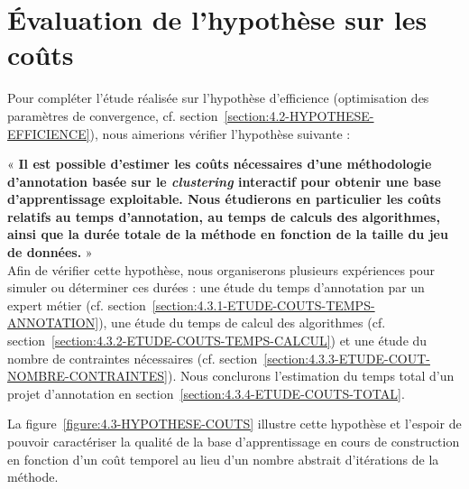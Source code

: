 \section{Évaluation de l'hypothèse sur les coûts}
\label{section:4.3-HYPOTHESE-COUTS}

	Pour compléter l'étude réalisée sur l'hypothèse d'efficience (optimisation des paramètres de convergence, cf. section~\ref{section:4.2-HYPOTHESE-EFFICIENCE}), nous aimerions vérifier l'hypothèse suivante :

	\begin{tcolorbox}[
		title=\faVial~\textbf{Hypothèse sur les coûts}~\faVial,
		colback=colorTcolorboxHypothesis!15,
		colframe=colorTcolorboxHypothesis!75,
		width=\linewidth
	]
		«\textbf{
			Il est possible d'\textbf{estimer les coûts nécessaires} d'une méthodologie d'annotation basée sur le \textit{clustering} interactif pour obtenir une base d'apprentissage exploitable. Nous étudierons en particulier les coûts relatifs au temps d'annotation, au temps de calculs des algorithmes, ainsi que la durée totale de la méthode en fonction de la taille du jeu de données.
		} » \\

		Afin de vérifier cette hypothèse, nous organiserons plusieurs expériences pour simuler ou déterminer ces durées : une étude du temps d'annotation par un expert métier (cf. section~\ref{section:4.3.1-ETUDE-COUTS-TEMPS-ANNOTATION}), une étude du temps de calcul des algorithmes (cf. section~\ref{section:4.3.2-ETUDE-COUTS-TEMPS-CALCUL}) et une étude du nombre de contraintes nécessaires (cf. section~\ref{section:4.3.3-ETUDE-COUT-NOMBRE-CONTRAINTES}). Nous conclurons l'estimation du temps total d'un projet d'annotation en section~\ref{section:4.3.4-ETUDE-COUTS-TOTAL}.
		
		La figure~\ref{figure:4.3-HYPOTHESE-COUTS} illustre cette hypothèse et l'espoir de pouvoir caractériser la qualité de la base d'apprentissage en cours de construction en fonction d'un coût temporel au lieu d'un nombre abstrait d'itérations de la méthode. 
		

\end{tcolorbox}
